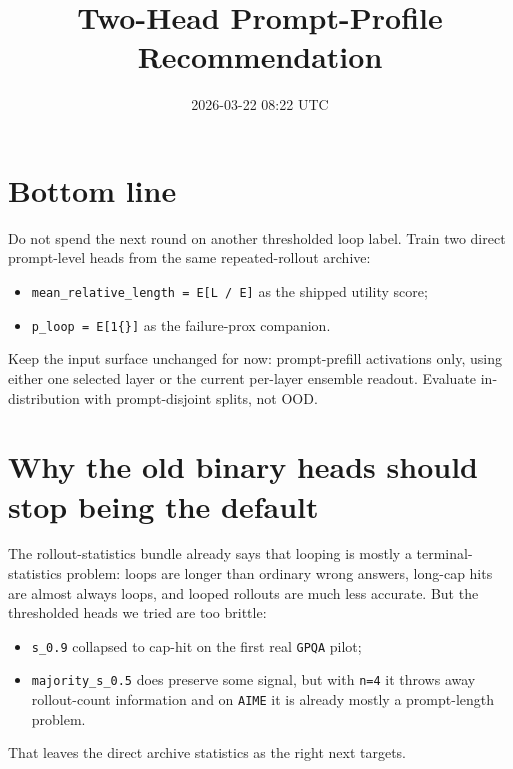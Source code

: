 \documentclass[11pt]{article}
\title{Two-Head Prompt-Profile Recommendation}
\author{}
\date{2026-03-22 08:22 UTC}
\begin{document}
\maketitle

\section*{Bottom line}
Do not spend the next round on another thresholded loop label. Train two direct
prompt-level heads from the same repeated-rollout archive:
\begin{itemize}[leftmargin=1.5em]
\item \texttt{mean\_relative\_length = E[L / E]} as the shipped utility score;
\item \texttt{p\_loop = E[1\{\}]} as the failure-prox companion.
\end{itemize}
Keep the input surface unchanged for now: prompt-prefill activations only, using
either one selected layer or the current per-layer ensemble readout. Evaluate
in-distribution with prompt-disjoint splits, not OOD.

\section*{Why the old binary heads should stop being the default}
The rollout-statistics bundle already says that looping is mostly a terminal-statistics
problem: loops are longer than ordinary wrong answers, long-cap hits are almost
always loops, and looped rollouts are much less accurate. But the thresholded
heads we tried are too brittle:
\begin{itemize}[leftmargin=1.5em]
\item \texttt{s\_0.9} collapsed to cap-hit on the first real \texttt{GPQA} pilot;
\item \texttt{majority\_s\_0.5} does preserve some signal, but with \texttt{n=4}
it throws away rollout-count information and on \texttt{AIME} it is already
mostly a prompt-length problem.
\end{itemize}
That leaves the direct archive statistics as the right next targets.
\end{document}
